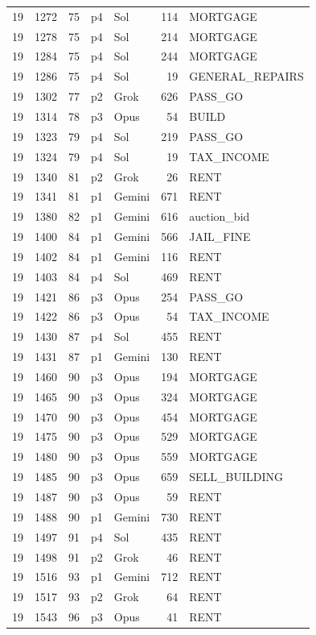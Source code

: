 \begin{longtable}{r r r l l r L{2.2in}}
19 & 1272 & 75 & p4 & Sol & 114 & MORTGAGE \\
19 & 1278 & 75 & p4 & Sol & 214 & MORTGAGE \\
19 & 1284 & 75 & p4 & Sol & 244 & MORTGAGE \\
19 & 1286 & 75 & p4 & Sol & 19 & GENERAL\_REPAIRS \\
19 & 1302 & 77 & p2 & Grok & 626 & PASS\_GO \\
19 & 1314 & 78 & p3 & Opus & 54 & BUILD \\
19 & 1323 & 79 & p4 & Sol & 219 & PASS\_GO \\
19 & 1324 & 79 & p4 & Sol & 19 & TAX\_INCOME \\
19 & 1340 & 81 & p2 & Grok & 26 & RENT \\
19 & 1341 & 81 & p1 & Gemini & 671 & RENT \\
19 & 1380 & 82 & p1 & Gemini & 616 & auction\_bid \\
19 & 1400 & 84 & p1 & Gemini & 566 & JAIL\_FINE \\
19 & 1402 & 84 & p1 & Gemini & 116 & RENT \\
19 & 1403 & 84 & p4 & Sol & 469 & RENT \\
19 & 1421 & 86 & p3 & Opus & 254 & PASS\_GO \\
19 & 1422 & 86 & p3 & Opus & 54 & TAX\_INCOME \\
19 & 1430 & 87 & p4 & Sol & 455 & RENT \\
19 & 1431 & 87 & p1 & Gemini & 130 & RENT \\
19 & 1460 & 90 & p3 & Opus & 194 & MORTGAGE \\
19 & 1465 & 90 & p3 & Opus & 324 & MORTGAGE \\
19 & 1470 & 90 & p3 & Opus & 454 & MORTGAGE \\
19 & 1475 & 90 & p3 & Opus & 529 & MORTGAGE \\
19 & 1480 & 90 & p3 & Opus & 559 & MORTGAGE \\
19 & 1485 & 90 & p3 & Opus & 659 & SELL\_BUILDING \\
19 & 1487 & 90 & p3 & Opus & 59 & RENT \\
19 & 1488 & 90 & p1 & Gemini & 730 & RENT \\
19 & 1497 & 91 & p4 & Sol & 435 & RENT \\
19 & 1498 & 91 & p2 & Grok & 46 & RENT \\
19 & 1516 & 93 & p1 & Gemini & 712 & RENT \\
19 & 1517 & 93 & p2 & Grok & 64 & RENT \\
19 & 1543 & 96 & p3 & Opus & 41 & RENT \\

\end{longtable}
